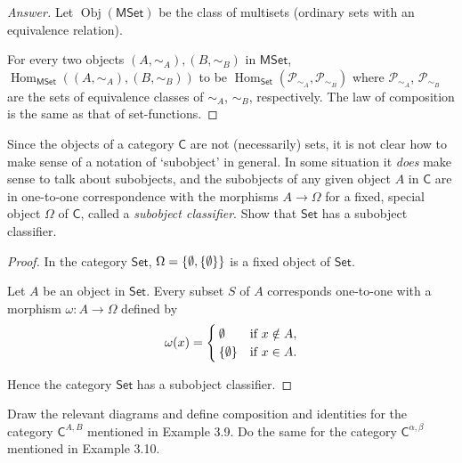\begin{proof}[Answer]
	Let $\operatorname{Obj}(\mathsf{MSet})$ be the class of multisets (ordinary sets with an equivalence relation).

	For every two objects $(A, \sim_{A}), (B, \sim_{B})$ in $\mathsf{MSet}$, $\operatorname{Hom}_{\mathsf{MSet}}((A, \sim_{A}), (B, \sim_{B}))$ to be $\operatorname{Hom}_{\mathsf{Set}}(\mathscr{P}_{\sim_{A}}, \mathscr{P}_{\sim_{B}})$ where $\mathscr{P}_{\sim_{A}}$, $\mathscr{P}_{\sim_{B}}$ are the sets of equivalence classes of $\sim_{A}$, $\sim_{B}$, respectively. The law of composition is the same as that of set-functions.
\end{proof}

\begin{exercise}{3.10}
	Since the objects of a category $\mathsf{C}$ are not (necessarily) sets, it is not clear how to make sense of a notation of `subobject' in general. In some situation it \textit{does} make sense to talk about subobjects, and the subobjects of any given object $A$ in $\mathsf{C}$ are in one-to-one correspondence with the morphisms $A\to \Omega$ for a fixed, special object $\Omega$ of $\mathsf{C}$, called a \textit{subobject classifier}. Show that $\mathsf{Set}$ has a subobject classifier.
\end{exercise}

\begin{proof}
	In the category $\mathsf{Set}$, $\Omega = \left\{{\emptyset, \left\{{\emptyset}\right\}}\right\}$ is a fixed object of $\mathsf{Set}$.

	Let $A$ be an object in $\mathsf{Set}$. Every subset $S$ of $A$ corresponds one-to-one with a morphism $\omega: A\to \Omega$ defined by
	\begin{align*}
		\omega(x) = \begin{cases}
			            \emptyset       & \text{if $x\notin A$}, \\
			            \left\{{\emptyset}\right\} & \text{if $x\in A$}.
		            \end{cases}
	\end{align*}

	Hence the category $\mathsf{Set}$ has a subobject classifier.
\end{proof}

\begin{exercise}{3.11}
	Draw the relevant diagrams and define composition and identities for the category ${\mathsf{C}}^{A, B}$ mentioned in Example 3.9. Do the same for the category ${\mathsf{C}}^{\alpha,\beta}$ mentioned in Example 3.10.
\end{exercise}

